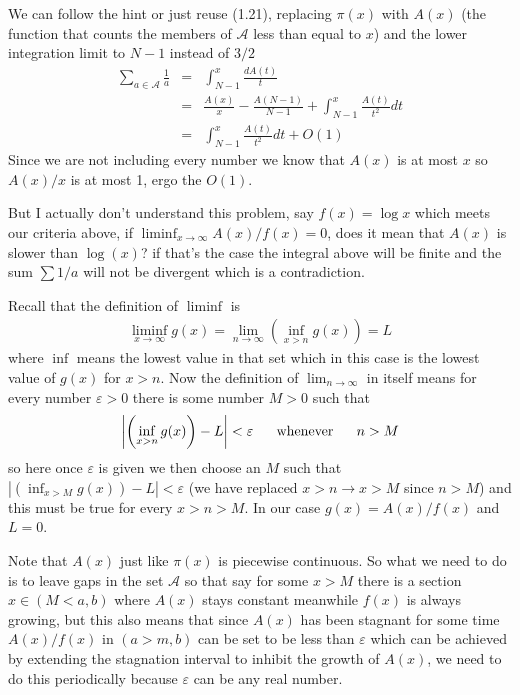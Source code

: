 \documentclass[aps,preprint,preprintnumbers,nofootinbib,showpacs,prd]{revtex4-1}
\newcommand{\nbea}{\begin{eqnarray*}}
\newcommand{\neea}{\end{eqnarray*}}
\begin{document}
We can follow the hint or just reuse (1.21), replacing $\pi(x)$ with $A(x)$ (the function that counts the members of $\mathcal{A}$ less than equal to $x$) and the lower integration limit to $N-1$ instead of $3/2$
%
\nbea
\sum_{a\in\mathcal{A}} \frac{1}{a} & = & \int_{N-1}^{x} \frac{dA(t)}{t} \\
& = & \frac{A(x)}{x} - \frac{A(N-1)}{N-1} + \int_{N-1}^x \frac{A(t)}{t^2}dt \\
& = & \int_{N-1}^x \frac{A(t)}{t^2}dt + O(1)
\neea
%
Since we are not including every number we know that $A(x)$ is at most $x$ so $A(x)/x$ is at most 1, ergo the $O(1)$.

But I actually don't understand this problem, say $f(x) = \log x$ which meets our criteria above, if $\liminf_{x\to\infty} A(x)/f(x) = 0$, does it mean that $A(x)$ is slower than $\log(x)$? if that's the case the integral above will be finite and the sum $\sum 1/a$ will not be divergent which is a contradiction.

Recall that the definition of $\liminf$ is
%
\nbea
\liminf_{x\to\infty} g(x) = \lim_{n\to\infty}\left(\inf_{x>n} g(x)\right) = L
\neea
%
where $\inf$ means the lowest value in that set which in this case is the lowest value of $g(x)$ for $x > n$. Now the definition of $\lim_{n\to\infty}$ in itself means for every number $\varepsilon > 0$ there is some number $M > 0$ such that
%
\nbea
\left|\left(\inf_{x>n} g(x)\right) - L\right| < \varepsilon ~~~~~ {\rm whenever} ~~~~~ n > M
\neea
%
so here once $\varepsilon$ is given we then choose an $M$ such that $\left|\left(\inf_{x>M} g(x)\right) - L\right| < \varepsilon$ (we have replaced $x>n \to x>M$ since $n > M$) and this must be true for every $x > n > M$. In our case $g(x) = A(x)/f(x)$ and $L = 0$.

Note that $A(x)$ just like $\pi(x)$ is piecewise continuous. So what we need to do is to leave gaps in the set $\mathcal{A}$ so that say for some $x > M$ there is a section $x\in(M<a,b)$ where $A(x)$ stays constant meanwhile $f(x)$ is always growing, but this also means that since $A(x)$ has been stagnant for some time $A(x)/f(x)$ in $(a>m,b)$ can be set to be less than $\varepsilon$ which can be achieved by extending the stagnation interval to inhibit the growth of $A(x)$, we need to do this periodically because $\varepsilon$ can be any real number.
\end{document}
